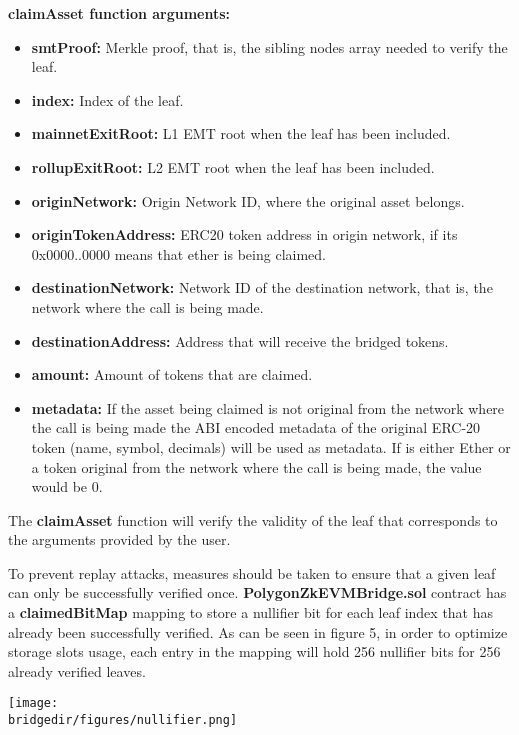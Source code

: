 \textbf{claimAsset function arguments:}

\begin{itemize}
	\item \textbf{smtProof:} Merkle proof, that is, the sibling nodes array needed to verify the leaf.
	\item \textbf{index:} Index of the leaf.
	\item \textbf{mainnetExitRoot:} L1 EMT root when the leaf has been included.
	\item \textbf{rollupExitRoot:} L2 EMT root when the leaf has been included.
	\item \textbf{originNetwork:} Origin Network ID, where the original asset belongs.
	\item \textbf{originTokenAddress:} ERC20 token address in origin network, if its 0x0000..0000 means that ether is being claimed.
	\item \textbf{destinationNetwork:} Network ID of the destination network, that is, the network where the call is being made.
	\item \textbf{destinationAddress:} Address that will receive the bridged tokens.
	\item \textbf{amount:} Amount of tokens that are claimed.
	\item \textbf{metadata:} If the asset being claimed is not original from the network where the call is being made the ABI encoded metadata of the original ERC-20 token (name, symbol, decimals) will be used as metadata. If is either Ether or a token original from the network where the call is being made, the value would be 0.
\end{itemize}


The \textbf{claimAsset} function will verify the validity of the leaf that corresponds to the arguments provided by the user.
	 		
To prevent replay attacks, measures should be taken to ensure that a given leaf can only be successfully verified once. \textbf{PolygonZkEVMBridge.sol} contract has a \textbf{claimedBitMap} mapping to store a nullifier bit for each leaf index that has already been successfully verified. As can be seen in figure 5, in order to optimize storage slots usage, each entry in the mapping will hold 256 nullifier bits for 256 already verified leaves.
	
	\begin{center}
		\texttt{[image: \\bridgedir/figures/nullifier.png]}	
	\end{center}
	
